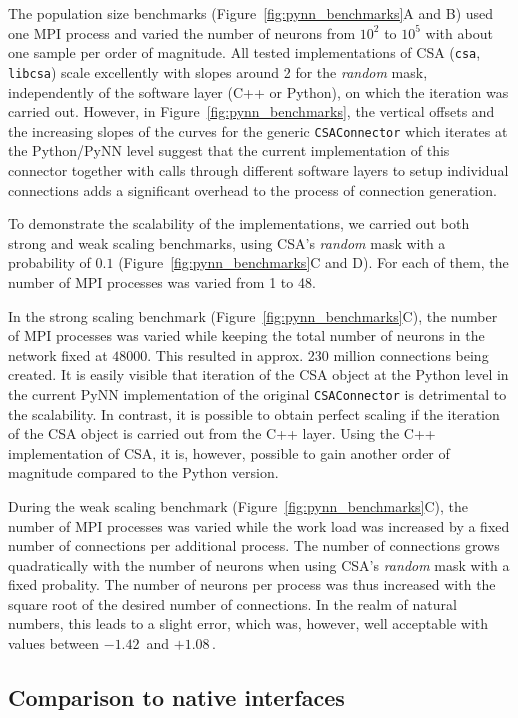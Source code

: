 \documentclass{frontiersSCNS} %
\newcommand{\permil}{\,\textperthousand\xspace}
\newcommand{\Figure}[2]{Figure~\ref{#2}}
\newcommand{\Figure}[2]{Figure~#1}
\begin{document}
The population size benchmarks (\Figure{4}{fig:pynn_benchmarks}A and
B) used one MPI process and varied the number of neurons from $10^2$
to $10^5$ with about one sample per order of magnitude. All tested
implementations of CSA (\verb|csa|, \verb|libcsa|) scale excellently
with slopes around 2 for the \emph{random} mask, independently of the
software layer (C++ or Python), on which the iteration was carried
out. However, in \Figure{4}{fig:pynn_benchmarks}, the vertical offsets
and the increasing slopes of the curves for the generic
\verb|CSAConnector| which iterates at the Python/PyNN level suggest
that the current implementation of this connector together with calls
through different software layers to setup individual connections adds
a significant overhead to the process of connection generation.

To demonstrate the scalability of the implementations, we carried out
both strong and weak scaling benchmarks, using CSA's \emph{random}
mask with a probability of $0.1$ (\Figure{4}{fig:pynn_benchmarks}C
and D). For each of them, the number of MPI processes was varied from
1 to 48.

In the strong scaling benchmark (\Figure{4}{fig:pynn_benchmarks}C),
the number of MPI processes was varied while keeping the total number
of neurons in the network fixed at $48000$. This resulted in
approx. 230 million connections being created. It is easily visible
that iteration of the CSA object at the Python level in the current
PyNN implementation of the original \verb|CSAConnector| is detrimental
to the scalability. In contrast, it is possible to obtain perfect
scaling if the iteration of the CSA object is carried out from the C++
layer. Using the C++ implementation of CSA, it is, however, possible
to gain another order of magnitude compared to the Python version.

During the weak scaling benchmark (\Figure{4}{fig:pynn_benchmarks}C),
the number of MPI processes was varied while the work load was
increased by a fixed number of connections per additional process.
The number of connections grows quadratically with the number of
neurons when using CSA's \emph{random} mask with a fixed
probality. The number of neurons per process was thus increased with
the square root of the desired number of connections. In the realm of
natural numbers, this leads to a slight error, which was, however,
well acceptable with values between $-1.42$\permil and $+1.08$\permil.

\subsection{Comparison to native interfaces}
\end{document}
